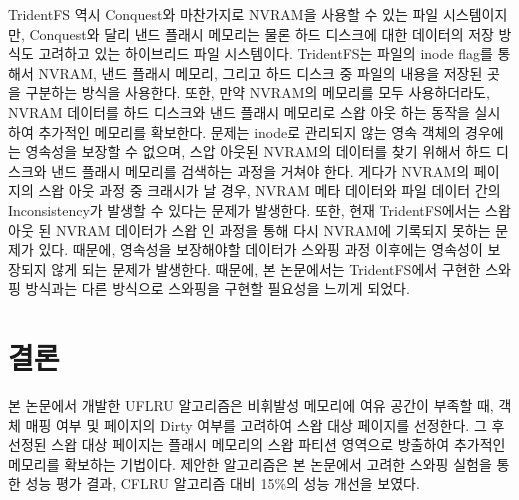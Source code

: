 \documentclass[letterpaper,twocolumn,10pt]{article}
\begin{document}
TridentFS 역시 Conquest와 마찬가지로 NVRAM을 사용할 수 있는 파일 시스템이지만, Conquest와 달리 낸드 플래시 메모리는 물론 하드 디스크에 대한 데이터의 저장 방식도 고려하고 있는 하이브리드 파일 시스템이다. TridentFS는 파일의 inode flag를 통해서 NVRAM, 낸드 플래시 메모리, 그리고 하드 디스크 중 파일의 내용을 저장된 곳을 구분하는 방식을 사용한다. 또한, 만약 NVRAM의 메모리를 모두 사용하더라도, NVRAM 데이터를 하드 디스크와 낸드 플래시 메모리로 스왑 아웃 하는 동작을 실시하여 추가적인 메모리를 확보한다.  
문제는 inode로 관리되지 않는 영속 객체의 경우에는 영속성을 보장할 수 없으며, 스압 아웃된 NVRAM의 데이터를 찾기 위해서 하드 디스크와 낸드 플래시 메모리를 검색하는 과정을 거쳐야 한다. 게다가 NVRAM의 페이지의 스왑 아웃 과정 중 크래시가 날 경우, NVRAM 메타 데이터와 파일 데이터 간의 Inconsistency가 발생할 수 있다는 문제가 발생한다. 또한, 현재 TridentFS에서는 스왑 아웃 된 NVRAM 데이터가 스왑 인 과정을 통해 다시 NVRAM에 기록되지 못하는 문제가 있다. 때문에, 영속성을 보장해야할 데이터가 스와핑 과정 이후에는 영속성이 보장되지 않게 되는 문제가 발생한다. 때문에, 본 논문에서는 TridentFS에서 구현한 스와핑 방식과는 다른 방식으로 스와핑을 구현할 필요성을 느끼게 되었다.


\section{결론}

본 논문에서 개발한 UFLRU 알고리즘은 비휘발성 메모리에 여유 공간이 부족할 때, 객체 매핑 여부 및 페이지의 Dirty 여부를 고려하여 스왑 대상 페이지를 선정한다. 그 후 선정된 스왑 대상 페이지는 플래시 메모리의 스왑 파티션 영역으로 방출하여 추가적인 메모리를 확보하는 기법이다. 제안한 알고리즘은 본 논문에서 고려한 스와핑 실험을 통한 성능 평가 결과, CFLRU 알고리즘 대비 15\%의 성능 개선을 보였다.

{\footnotesize 
}
\end{document}
